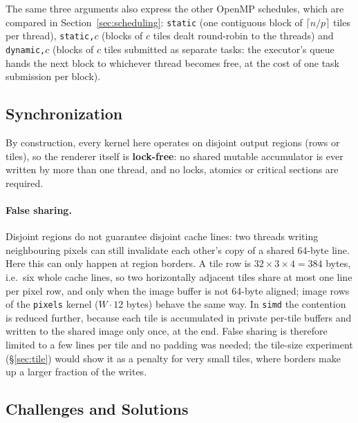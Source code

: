 \documentclass[10pt,twocolumn,letterpaper]{article}
\begin{document}
The same three arguments also express the other OpenMP schedules, which
are compared in Section~\ref{sec:scheduling}: \texttt{static} (one
contiguous block of $\lceil n/p\rceil$ tiles per thread),
\texttt{static,}$c$ (blocks of $c$ tiles dealt round-robin to the threads)
and \texttt{dynamic,}$c$ (blocks of $c$ tiles submitted as separate tasks:
the executor's queue hands the next block to whichever thread becomes free,
at the cost of one task submission per block).

\subsection{Synchronization}

By construction, every kernel here operates on disjoint output regions
(rows or tiles), so the renderer itself is \textbf{lock-free}: no shared
mutable accumulator is ever written by more than one thread, and no locks,
atomics or critical sections are required.

\paragraph{False sharing.} Disjoint regions do not guarantee disjoint cache
lines: two threads writing neighbouring pixels can still invalidate each
other's copy of a shared 64-byte line. Here this can only happen at region
borders. A tile row is $32\times3\times4=384$ bytes, i.e.\ six whole cache
lines, so two horizontally adjacent tiles share at most one line per pixel
row, and only when the image buffer is not 64-byte aligned; image rows of
the \texttt{pixels} kernel ($W\cdot 12$ bytes) behave the same way. In
\texttt{simd} the contention is reduced further, because each tile is
accumulated in private per-tile buffers and written to the shared image
only once, at the end. False sharing is therefore limited to a few lines
per tile and no padding was needed; the tile-size experiment
(\S\ref{sec:tile}) would show it as a penalty for very small tiles, where
borders make up a larger fraction of the writes.

\subsection{Challenges and Solutions}
\end{document}
